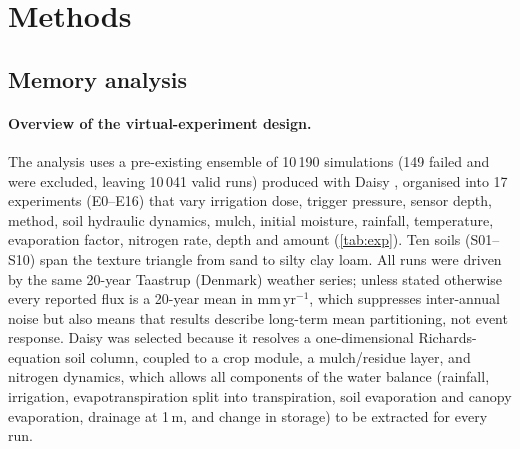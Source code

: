\documentclass[preprint,12pt,authoryear]{elsarticle}
\begin{document}
\section{Methods}
\subsection{Memory analysis}
\label{sec:methods}
\paragraph{Overview of the virtual-experiment design.}
The analysis uses a pre-existing ensemble of 10\,190 simulations (149 failed and were excluded, leaving 10\,041 valid runs) produced with Daisy \citep{Hansen2012,Holbak2026}, organised into 17 experiments (E0--E16) that vary irrigation dose, trigger pressure, sensor depth, method, soil hydraulic dynamics, mulch, initial moisture, rainfall, temperature, evaporation factor, nitrogen rate, depth and amount (\cref{tab:exp}). Ten soils (S01--S10) span the texture triangle from sand to silty clay loam. All runs were driven by the same 20-year Taastrup (Denmark) weather series; unless stated otherwise every reported flux is a 20-year mean in mm\,yr$^{-1}$, which suppresses inter-annual noise but also means that results describe long-term mean partitioning, not event response. Daisy was selected because it resolves a one-dimensional Richards-equation soil column, coupled to a crop module, a mulch/residue layer, and nitrogen dynamics, which allows all components of the water balance (rainfall, irrigation, evapotranspiration split into transpiration, soil evaporation and canopy evaporation, drainage at 1\,m, and change in storage) to be extracted for every run.
\end{document}
